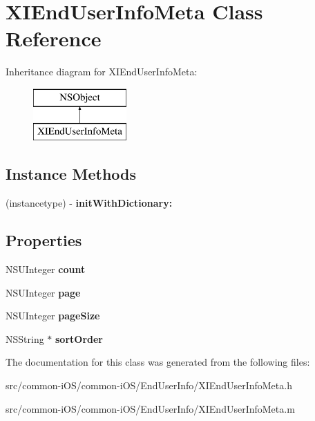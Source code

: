 \hypertarget{interface_x_i_end_user_info_meta}{}\section{X\+I\+End\+User\+Info\+Meta Class Reference}
\label{interface_x_i_end_user_info_meta}
Inheritance diagram for X\+I\+End\+User\+Info\+Meta\+:\begin{figure}[H]
\begin{center}
\leavevmode
\includegraphics[height=2.000000cm]{interface_x_i_end_user_info_meta}
\end{center}
\end{figure}
\subsection*{Instance Methods}
\begin{DoxyCompactItemize}
\item 
\hypertarget{interface_x_i_end_user_info_meta_a1f633af0d3e94dd069f427a10ec1b766}{}\label{interface_x_i_end_user_info_meta_a1f633af0d3e94dd069f427a10ec1b766} 
(instancetype) -\/ {\bfseries init\+With\+Dictionary\+:}
\end{DoxyCompactItemize}
\subsection*{Properties}
\begin{DoxyCompactItemize}
\item 
\hypertarget{interface_x_i_end_user_info_meta_af80565dad46a4aebbcdcd37c1cbc9439}{}\label{interface_x_i_end_user_info_meta_af80565dad46a4aebbcdcd37c1cbc9439} 
N\+S\+U\+Integer {\bfseries count}
\item 
\hypertarget{interface_x_i_end_user_info_meta_a1b07c1e48a76941236e73783f298479c}{}\label{interface_x_i_end_user_info_meta_a1b07c1e48a76941236e73783f298479c} 
N\+S\+U\+Integer {\bfseries page}
\item 
\hypertarget{interface_x_i_end_user_info_meta_a27adf7997e94b53f5fc28025d9434eae}{}\label{interface_x_i_end_user_info_meta_a27adf7997e94b53f5fc28025d9434eae} 
N\+S\+U\+Integer {\bfseries page\+Size}
\item 
\hypertarget{interface_x_i_end_user_info_meta_a70cea18542bb157b0a1de13818883747}{}\label{interface_x_i_end_user_info_meta_a70cea18542bb157b0a1de13818883747} 
N\+S\+String $\ast$ {\bfseries sort\+Order}
\end{DoxyCompactItemize}


The documentation for this class was generated from the following files\+:\begin{DoxyCompactItemize}
\item 
src/common-\/i\+O\+S/common-\/i\+O\+S/\+End\+User\+Info/X\+I\+End\+User\+Info\+Meta.\+h\item 
src/common-\/i\+O\+S/common-\/i\+O\+S/\+End\+User\+Info/X\+I\+End\+User\+Info\+Meta.\+m\end{DoxyCompactItemize}
